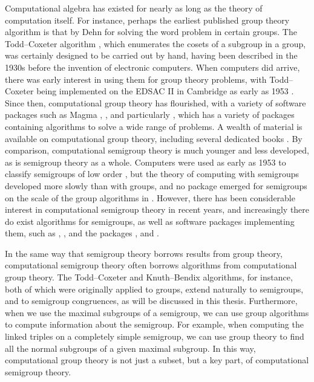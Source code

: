 Computational algebra has existed for nearly as long as the theory of
computation itself.  For instance, perhaps the earliest published group theory
algorithm is that by Dehn \cite{dehn_1911} for solving the word problem in
certain groups.  The Todd--Coxeter algorithm \cite{todd_coxeter_1936}, which
enumerates the cosets of a subgroup in a group, was certainly designed to be
carried out by hand, having been described in the 1930s before the invention of
electronic computers.  When computers did arrive, there was early interest in
using them for group theory problems, with Todd--Coxeter being implemented on
the EDSAC II in Cambridge as early as 1953 \cite{leech_1963}.  Since then,
computational group theory has flourished, with a variety of software packages
such as \textsf{Magma} \cite{magma}, \ACE{} \cite{ace}, and particularly \GAP{}
\cite{gap}, which has a variety of packages containing algorithms to solve a
wide range of problems.  A wealth of material is available on computational
group theory, including several dedicated books \cite{sims, cgt}.  By
comparison, computational semigroup theory is much younger and less developed,
as is semigroup theory as a whole.  Computers were used as early as 1953 to
classify semigroups of low order \cite{tamura_1953, froidure_pin}, but the
theory of computing with semigroups developed more slowly than with groups, and
no package emerged for semigroups on the scale of the group algorithms in
\GAP{}.  However, there has been considerable interest in computational
semigroup theory in recent years, and increasingly there do exist algorithms for
semigroups, as well as software packages implementing them, such as
\Semigroupe{} \cite{semigroupe}, \libsemigroups{} \cite{libsemigroups}, and the
\GAP{} packages \Semigroups{} \cite{semigroups}, \smallsemi{} \cite{smallsemi}
and \kbmag{} \cite{kbmag}.

In the same way that semigroup theory borrows results from group theory,
computational semigroup theory often borrows algorithms from computational group
theory.  The Todd--Coxeter and Knuth--Bendix algorithms, for instance, both of
which were originally applied to groups, extend naturally to semigroups, and to
semigroup congruences, as will be discussed in this thesis.  Furthermore, when
we use the maximal subgroups of a semigroup, we can use group algorithms to
compute information about the semigroup.  For example, when computing the linked
triples on a completely simple semigroup, we can use group theory to find all
the normal subgroups of a given maximal subgroup.  In this way, computational
group theory is not just a subset, but a key part, of computational semigroup
theory.

